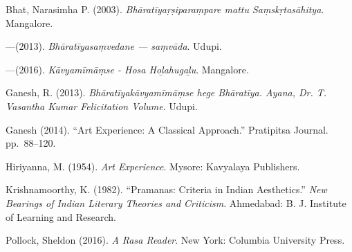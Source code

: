\begin{thebibliography}{99}
\itemsep=2pt
Bhat, Narasimha P. (2003). {\sl Bhāratīyaṛṣiparaṃpare mattu Saṃskṛtasāhitya}. Mangalore. 

---\kern3pt(2013). {\sl Bhāratīyasaṃvedane --- saṃvāda}. Udupi.

---\kern3pt(2016). {\sl Kāvyamīmāṃse - Hosa Hoḻahugaḻu}. Mangalore.

Ganesh, R. (2013). {\sl Bhāratīyakāvyamīmāṃse hege Bhāratīya. Ayana, Dr. T. Vasantha Kumar Felicitation Volume}. Udupi.

Ganesh (2014). ``Art Experience: A Classical Approach.'' Pratipitsa Journal. pp.~88--120.

Hiriyanna, M. (1954). {\sl Art Experience}. Mysore: Kavyalaya Publishers.

Krishnamoorthy, K. (1982). ``Pramanas: Criteria in Indian Aesthetics.'' {\sl New Bearings of Indian Literary Theories and Criticism}. Ahmedabad: B. J. Institute of Learning and Research.

Pollock, Sheldon (2016). {\sl A Rasa Reader}. New York: Columbia University Press.
\end{thebibliography}

\theendnotes
